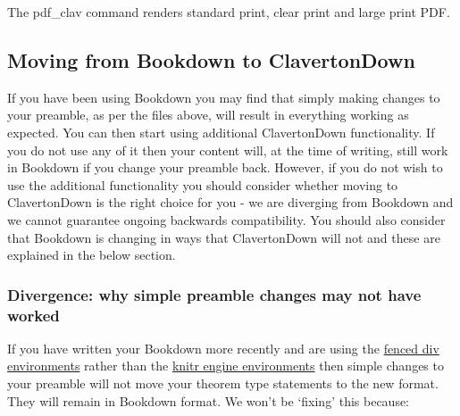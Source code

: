 \documentclass[
  10pt,
  a4paper]{article}
\theoremstyle{plain}
\theoremstyle{definition}
\theoremstyle{plain}
\theoremstyle{plain}
\theoremstyle{plain}
\theoremstyle{plain}
\theoremstyle{definition}
\theoremstyle{definition}
\theoremstyle{remark}
\theoremstyle{remark}
\begin{document}
The pdf\_clav command renders standard print, clear print and large print PDF.

\hypertarget{moving-from-bookdown-to-clavertondown}{%
\subsection{Moving from Bookdown to ClavertonDown}\label{moving-from-bookdown-to-clavertondown}}

If you have been using Bookdown you may find that simply making changes to your preamble, as per the files above, will result in everything working as expected. You can then start using additional ClavertonDown functionality. If you do not use any of it then your content will, at the time of writing, still work in Bookdown if you change your preamble back. However, if you do not wish to use the additional functionality you should consider whether moving to ClavertonDown is the right choice for you - we are diverging from Bookdown and we cannot guarantee ongoing backwards compatibility. You should also consider that Bookdown is changing in ways that ClavertonDown will not and these are explained in the below section.

\hypertarget{divergence-why-simple-preamble-changes-may-not-have-worked}{%
\subsubsection{Divergence: why simple preamble changes may not have worked}\label{divergence-why-simple-preamble-changes-may-not-have-worked}}

If you have written your Bookdown more recently and are using the \href{https://bookdown.org/yihui/bookdown/markdown-extensions-by-bookdown.html\#theorems}{fenced div environments} rather than the \href{https://bookdown.org/yihui/bookdown/markdown-extensions-by-bookdown.html\#theorem-engine}{knitr engine environments} then simple changes to your preamble will not move your theorem type statements to the new format. They will remain in Bookdown format. We won't be `fixing' this because:
\end{document}
